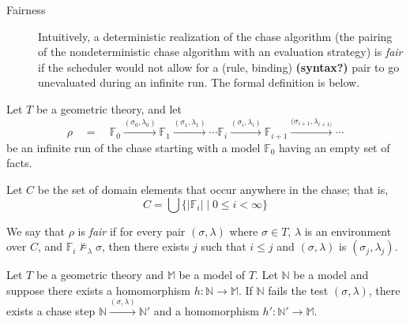 		\label{fairness_definition}
		\begin{description}
		\item [Fairness] Intuitively, a deterministic realization of the chase
		algorithm (the pairing of the nondeterministic chase algorithm with an
		evaluation strategy) is \emph{fair} if the scheduler would not allow
		for a (rule, binding) \textbf{(syntax?)} pair to go unevaluated during
		an infinite run. The formal definition is below.
		\end{description}

		\begin{definition}
		Let $T$ be a geometric theory, and let
			\[
			\rho \quad = \quad \mathbb{F}_0 \xrightarrow{(\sigma_0,\lambda_0)}
			\mathbb{F}_1 \xrightarrow{(\sigma_1,\lambda_1)} %
			\cdots \mathbb{F}_{i} \xrightarrow{(\sigma_i,\lambda_i)}
			\mathbb{F}_{i+1} \xrightarrow{(\sigma_{i+1},\lambda_{i+1)}} \cdots
			\]
		be an infinite run of the chase starting with a model $\mathbb{F}_0$
		having an empty set of facts.

		Let $C$ be the set of domain elements that occur anywhere in the chase;
		that is,
			\[
			C = \bigcup \{ | \mathbb{F}_{i} | \mid 0 \leq i < \infty \}
			\]

		We say that $\rho$ is \emph{fair} if for every pair $(\sigma,\lambda)$
		where $\sigma \in T$, $\lambda$ is an environment over $C$, and
		$\mathbb{F}_i \not\models_{\lambda} \sigma$, then there exists $j$ such
		that $i \leq j$ and $(\sigma,\lambda)$ is $(\sigma_j,\lambda_j)$.
		\end{definition}

		\begin{lemma}
			Let $T$ be a geometric theory and $\mathbb{M}$ be a model of $T$.
			Let $\mathbb{N}$ be a model and suppose there exists a homomorphism
			$h : \mathbb{N} \to \mathbb{M}$. If $\mathbb{N}$ fails the test
			$(\sigma,\lambda)$, there exists a chase step $\mathbb{N}
			\xrightarrow{(\sigma,\lambda)} \mathbb{N}'$ and a homomorphism $h'
			: \mathbb{N}' \to \mathbb{M}$.
		\end{lemma}

